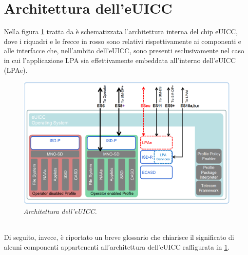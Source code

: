 \documentclass[10pt, oneside]{book}
\begin{document}
\section{Architettura dell'eUICC}
Nella figura \ref{fig:eUICC-arch} tratta da \cite{GSMA-docs-new} è schematizzata l'architettura interna del chip eUICC, dove i riquadri e le frecce in rosso sono relativi rispettivamente ai componenti e alle interfacce che, nell'ambito dell'eUICC, sono presenti esclusivamente nel caso in cui l'applicazione LPA sia effettivamente embeddata all'interno dell'eUICC (LPAe).
\begin{figure}
\includegraphics[width=\linewidth]{eUICC-arch.png}
\caption{\textit{Architettura dell'eUICC.}}
\label{fig:eUICC-arch}
\end{figure}
\\Di seguito, invece, è riportato un breve glossario che chiarisce il significato di alcuni componenti appartenenti all'architettura dell'eUICC raffigurata in \ref{fig:eUICC-arch}.
\end{document}
